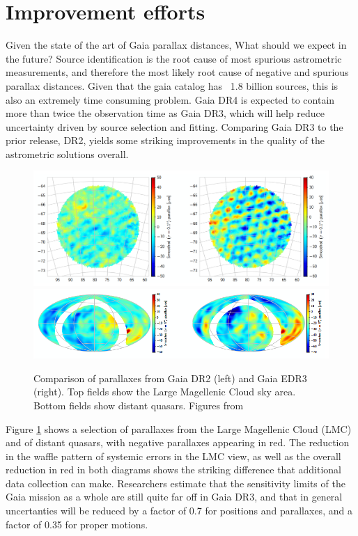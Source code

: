 \documentclass[twocolumn]{aastex631}
\begin{document}
\section{Improvement efforts} \label{sec:improvement}

Given the state of the art of Gaia parallax distances, What should we expect in the future? Source identification is the root cause of most spurious astrometric measurements, and therefore the most likely root cause of negative and spurious parallax distances. Given that the gaia catalog has ~1.8 billion sources, this is also an extremely time consuming problem. Gaia DR4 is expected to contain more than twice the observation time as Gaia DR3, which will help reduce uncertainty driven by source selection and fitting\citep{lindegrenGaia2021a}. Comparing Gaia DR3 to the prior release, DR2, yields some striking improvements in the quality of the astrometric solutions overall.
\begin{figure}
	\includegraphics[width=\columnwidth]{lmcDR2vsDR3crop.png}
	\includegraphics[width=\columnwidth]{quasarcrop.png}
	\caption{Comparison of parallaxes from Gaia DR2 (left) and Gaia EDR3 (right). Top fields show the Large Magellenic Cloud sky area. Bottom fields show distant quasars. Figures from \cite{lindegrenGaia2021a}}
	\label{fig:compare}
\end{figure}

Figure \ref{fig:compare} shows a selection of parallaxes from the Large Magellenic Cloud (LMC) and of distant quasars, with negative parallaxes appearing in red. The reduction in the waffle pattern of systemic errors in the LMC view, as well as the overall reduction in red in both diagrams shows the striking difference that additional data collection can make. Researchers estimate that the sensitivity limits of the Gaia mission as a whole are still quite far off in Gaia DR3, and that in general uncertanties will be reduced by a factor of 0.7 for positions and parallaxes, and a factor of 0.35 for proper motions\citep{lindegrenGaia2021a}.
\end{document}

